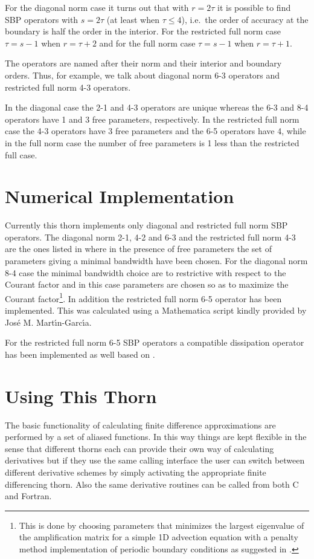 For the diagonal norm case it turns out that with $r=2\tau$ it is possible
to find SBP operators with $s=2\tau$ (at least when $\tau\le 4$), i.e.\ the
order of accuracy at the boundary is half the order in the interior. For the
restricted full norm case $\tau = s-1$ when $r=\tau +2$ and for the full norm
case $\tau = s-1$ when $r=\tau + 1$.

The operators are named after their norm and their interior and boundary
orders. Thus, for example, we talk about diagonal norm 6-3 operators and
restricted full norm 4-3 operators.

In the diagonal case the 2-1 and 4-3 operators are unique whereas the 6-3
and 8-4 operators have 1 and 3 free parameters, respectively. In the restricted
full norm case the 4-3 operators have 3 free parameters and the 6-5 operators
have 4, while in the full norm case the number of free parameters is 1 less
than the restricted full case.
\section{Numerical Implementation}
Currently this thorn implements only diagonal and restricted full norm SBP
operators. The diagonal norm 2-1, 4-2 and 6-3 and the restricted full norm
4-3 are the ones listed in \cite{strand93} where in the presence of free
parameters the set of parameters giving a minimal bandwidth have been chosen.
For the diagonal norm 8-4 case the minimal bandwidth choice are to restrictive
with respect to the Courant factor and in this case parameters are chosen
so as to maximize the Courant factor\footnote{This is done by choosing
parameters that minimizes the largest eigenvalue of the amplification matrix
for a simple 1D advection equation with a penalty method implementation of
periodic boundary conditions as suggested in \cite{lrt05}.}. In addition the
restricted full norm 6-5 operator has been implemented. This was calculated
using a Mathematica script kindly provided by Jos\'{e} M.
Mart\'{\i}n-Garc\'{\i}a.

For the restricted full norm 6-5 SBP operators a compatible dissipation
operator has been implemented as well based on \cite{msn04}.
\section{Using This Thorn}
The basic functionality of calculating finite difference approximations are
performed by a set of aliased functions. In this way things are kept flexible
in the sense that different thorns each can provide their own way of
calculating derivatives but if they use the same calling interface the
user can switch between different derivative schemes by simply activating
the appropriate finite differencing thorn. Also the same derivative routines
can be called from both C and Fortran.

